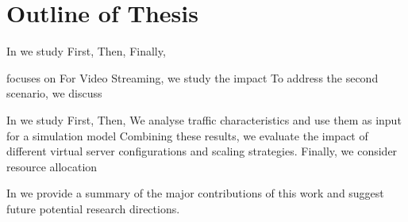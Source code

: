 \section{Outline of Thesis}\label{sec:introduction:outline}

In  we study
First,
Then,
Finally,

 focuses on
For Video Streaming, we study the impact
To address the second scenario, we discuss

In  we study
First,
Then,
We analyse traffic characteristics and use them as input for a simulation model
Combining these results, we evaluate the impact of different virtual server configurations and scaling strategies.
Finally, we consider resource allocation

In  we provide a summary of the major contributions of this work and suggest future potential research directions.
